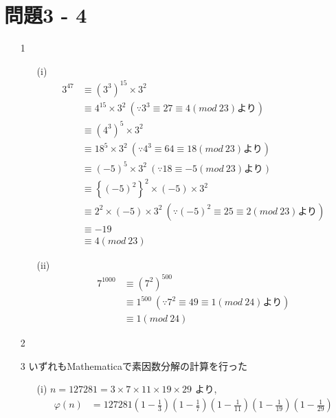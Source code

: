 \documentclass[12pt,a4paper]{jsarticle}
\begin{document}
\section*{問題3 - 4}
\begin{enumerate}
 \item[1]  \mbox{} \\
 \begin{itemize}
 \item[(i)]
 \begin{align*}
 3^{47} &\equiv (3^3)^{15} \times 3^2 \\
      &\equiv 4^{15} \times 3^2 ~(\because 3^3 \equiv 27 \equiv 4 (mod~23) \mbox{より}) \\
      &\equiv (4^3)^5 \times 3^2 \\
      &\equiv 18^5 \times 3^2 ~(\because 4^3 \equiv 64 \equiv 18 (mod~23) \mbox{より}) \\
      &\equiv (-5)^5 \times 3^2 ~(\because 18 \equiv -5 (mod~23) \mbox{より}) \\
      &\equiv \left\{(-5)^2 \right\}^2 \times (-5) \times 3^2 \\
      &\equiv 2^2 \times (-5) \times 3^2 ~(\because (-5)^2 \equiv 25 \equiv 2 (mod~23) \mbox{より}) \\
      &\equiv -19 \\
      &\equiv 4 (mod~23)
 \end{align*}
 \item[(ii)]
 \begin{align*}
 7^{1000} &\equiv (7^2)^{500} \\
      &\equiv 1^{500} ~(\because 7^2 \equiv 49 \equiv 1 (mod~24)\mbox{より}) \\
      &\equiv 1 (mod~24)
 \end{align*}
 \end{itemize}
 \item[2]  \mbox{} \\
 \item[3]  \mbox{いずれもMathematicaで素因数分解の計算を行った} \\
 \begin{itemize}
 \item[(i)]
 $n = 127281 = 3 \times 7 \times 11 \times 19 \times 29 $ より,
 \begin{align*}
 \varphi(n) &= 127281 \left(1-\frac{1}{3}\right) \left(1-\frac{1}{7}\right)
   \left(1-\frac{1}{11}\right) \left(1-\frac{1}{19}\right)
   \left(1-\frac{1}{29}\right) \\

\end{align*}
\end{itemize}
\end{enumerate}
\end{document}

